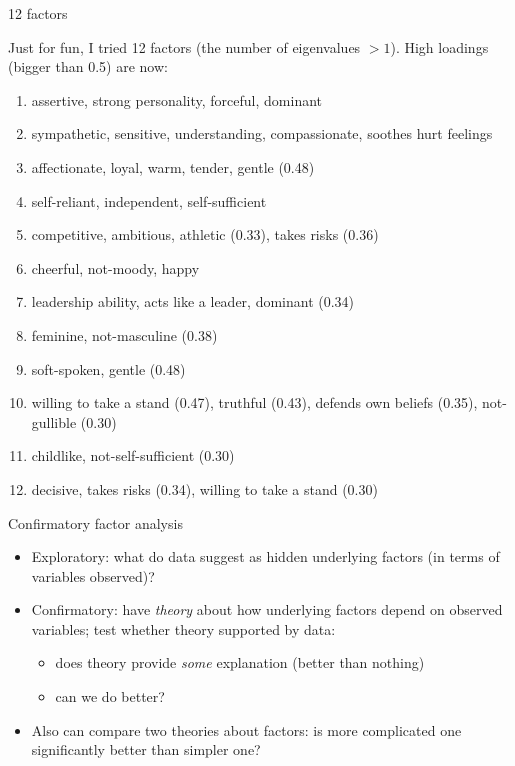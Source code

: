 \documentclass[pdf]{prosper}
\begin{document}
\begin{slide}{12 factors}

Just for fun, I tried 12 factors (the number of eigenvalues $>1$). High loadings (bigger than 0.5) are now:

\begin{enumerate}
\item assertive, strong personality, forceful, dominant 
\item sympathetic, sensitive, understanding, compassionate, soothes hurt feelings
\item affectionate, loyal, warm, tender, gentle (0.48)
\item self-reliant, independent, self-sufficient
\item competitive, ambitious, athletic (0.33), takes risks (0.36) 
\item cheerful, not-moody, happy
\item leadership ability, acts like a leader, dominant (0.34)
\item feminine, not-masculine (0.38)
\item soft-spoken, gentle (0.48)
\item willing to take a stand (0.47), truthful (0.43), defends own beliefs (0.35), not-gullible (0.30)
\item childlike, not-self-sufficient (0.30)
\item decisive, takes risks (0.34), willing to take a stand (0.30)
\end{enumerate}
  

  
\end{slide}

\begin{slide}{Confirmatory factor analysis}

  \begin{itemize}
  \item Exploratory: what do data suggest as hidden underlying factors (in terms of variables observed)?
  \item Confirmatory: have {\em theory} about how underlying factors depend on observed variables; test whether theory supported by data:
    \begin{itemize}
    \item does theory provide {\em some} explanation (better than nothing)
    \item can we do better?
    \end{itemize}
  \item Also can compare two theories about factors: is more complicated one significantly better than simpler one?
  \end{itemize}
  
\end{slide}
\end{document}
